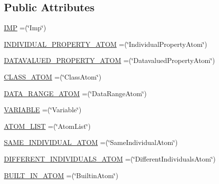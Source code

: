 \subsection*{Public Attributes}
\begin{DoxyCompactItemize}
\item 
\hyperlink{enumorg_1_1semanticweb_1_1owlapi_1_1vocab_1_1_s_w_r_l_vocabulary_a0b2ee8ef345e4cbbb033d7c58cbcdf7f}{I\-M\-P} =(\char`\"{}Imp\char`\"{})
\item 
\hyperlink{enumorg_1_1semanticweb_1_1owlapi_1_1vocab_1_1_s_w_r_l_vocabulary_acea7a801a520aff5245fefd3e1178bab}{I\-N\-D\-I\-V\-I\-D\-U\-A\-L\-\_\-\-P\-R\-O\-P\-E\-R\-T\-Y\-\_\-\-A\-T\-O\-M} =(\char`\"{}Individual\-Property\-Atom\char`\"{})
\item 
\hyperlink{enumorg_1_1semanticweb_1_1owlapi_1_1vocab_1_1_s_w_r_l_vocabulary_ae21b104ed8a6cf96b3dba4bfd8703146}{D\-A\-T\-A\-V\-A\-L\-U\-E\-D\-\_\-\-P\-R\-O\-P\-E\-R\-T\-Y\-\_\-\-A\-T\-O\-M} =(\char`\"{}Datavalued\-Property\-Atom\char`\"{})
\item 
\hyperlink{enumorg_1_1semanticweb_1_1owlapi_1_1vocab_1_1_s_w_r_l_vocabulary_a0c3983a5cd42b3820a2ad75ea353116e}{C\-L\-A\-S\-S\-\_\-\-A\-T\-O\-M} =(\char`\"{}Class\-Atom\char`\"{})
\item 
\hyperlink{enumorg_1_1semanticweb_1_1owlapi_1_1vocab_1_1_s_w_r_l_vocabulary_a3edb55225b999dfca97375fcda8f94aa}{D\-A\-T\-A\-\_\-\-R\-A\-N\-G\-E\-\_\-\-A\-T\-O\-M} =(\char`\"{}Data\-Range\-Atom\char`\"{})
\item 
\hyperlink{enumorg_1_1semanticweb_1_1owlapi_1_1vocab_1_1_s_w_r_l_vocabulary_a21111a34b7fd9e4a6b2a5671783fe3ed}{V\-A\-R\-I\-A\-B\-L\-E} =(\char`\"{}Variable\char`\"{})
\item 
\hyperlink{enumorg_1_1semanticweb_1_1owlapi_1_1vocab_1_1_s_w_r_l_vocabulary_a213bb3b9f8914bec9b4946a1015d6dee}{A\-T\-O\-M\-\_\-\-L\-I\-S\-T} =(\char`\"{}Atom\-List\char`\"{})
\item 
\hyperlink{enumorg_1_1semanticweb_1_1owlapi_1_1vocab_1_1_s_w_r_l_vocabulary_a974f61a558cbda2159c86e0f03828220}{S\-A\-M\-E\-\_\-\-I\-N\-D\-I\-V\-I\-D\-U\-A\-L\-\_\-\-A\-T\-O\-M} =(\char`\"{}Same\-Individual\-Atom\char`\"{})
\item 
\hyperlink{enumorg_1_1semanticweb_1_1owlapi_1_1vocab_1_1_s_w_r_l_vocabulary_a80a31fdf6cf824fecaa5650fec44a250}{D\-I\-F\-F\-E\-R\-E\-N\-T\-\_\-\-I\-N\-D\-I\-V\-I\-D\-U\-A\-L\-S\-\_\-\-A\-T\-O\-M} =(\char`\"{}Different\-Individuals\-Atom\char`\"{})
\item 
\hyperlink{enumorg_1_1semanticweb_1_1owlapi_1_1vocab_1_1_s_w_r_l_vocabulary_ac72ccba6f7ebcfd7ba0177236e7cd600}{B\-U\-I\-L\-T\-\_\-\-I\-N\-\_\-\-A\-T\-O\-M} =(\char`\"{}Builtin\-Atom\char`\"{})

\end{DoxyCompactItemize}

